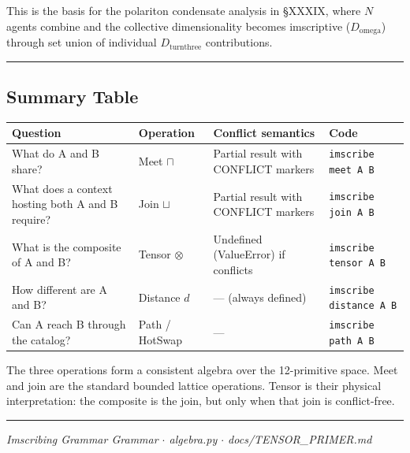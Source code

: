 \documentclass[12pt,a4paper]{article}
\newcommand{\pilcrow}{\S}
\begin{document}
This is the basis for the polariton condensate analysis in \pilcrow{}XXXIX, where $N$ agents combine and the collective dimensionality becomes imscriptive ($D_{\text{omega}}$) through set union of individual $D_{\text{turnthree}}$ contributions.

\begin{center}
\rule{0.5\textwidth}{0.4pt}
\end{center}

\subsection{Summary Table}

\begin{table}[htbp]
\centering
\small
{}
\begin{tabularx}{\textwidth}{>{\centering\arraybackslash}X >{\centering\arraybackslash}X >{\centering\arraybackslash}X >{\centering\arraybackslash}X}
\toprule
\rowcolor{gray!25}\textbf{Question} & \textbf{Operation} & \textbf{Conflict semantics} & \textbf{Code} \\
\midrule
\rowcolors{1}{white}{gray!10}
What do A and B share? & Meet $\sqcap$ & Partial result with CONFLICT markers & \texttt{imscribe meet A B} \\
What does a context hosting both A and B require? & Join $\sqcup$ & Partial result with CONFLICT markers & \texttt{imscribe join A B} \\
What is the composite of A and B? & Tensor $\otimes$ & Undefined (ValueError) if conflicts & \texttt{imscribe tensor A B} \\
How different are A and B? & Distance $d$ & --- (always defined) & \texttt{imscribe distance A B} \\
Can A reach B through the catalog? & Path / HotSwap & --- & \texttt{imscribe path A B} \\
\bottomrule
\end{tabularx}
\end{table}

The three operations form a consistent algebra over the 12-primitive space. Meet and join are the standard bounded lattice operations. Tensor is their physical interpretation: the composite is the join, but only when that join is conflict-free.

\begin{center}
\rule{0.5\textwidth}{0.4pt}
\end{center}

\emph{Imscribing Grammar Grammar $\cdot$ algebra.py $\cdot$ docs/TENSOR\_PRIMER.md}
\end{document}
